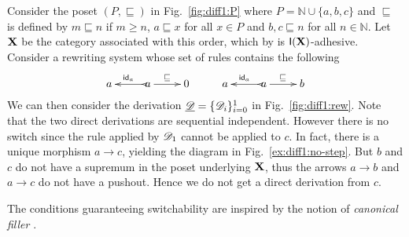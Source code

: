 \begin{example}
	\label{ex:diff1}
	Consider the poset $(P, \sqsubseteq)$ in Fig.~\ref{fig:diff1:P} where
	$P = \mathbb{N} \cup \{a,b,c\}$ and $\sqsubseteq$ is defined by
	$m \sqsubseteq n$ if $m \geq n$, $a \sqsubseteq x$ for all $x \in P$
	and $b, c \sqsubseteq n$ for all $n \in \mathbb{N}$.
	Let $\textbf {\textup{X}}$ be the  
	category associated with this order, which by  is
	$\mathsf{I(\textbf {\textup{X}})}$-adhesive. 
	Consider a rewriting
	system whose set of rules contains the following 
	\[\xymatrix{a & a \ar[r]^{\sqsubseteq} \ar@{>->}[l]_{\id{a}} & 0 & a & a
		\ar[r]^{\sqsubseteq} \ar@{>->}[l]_{\id{a}} & b }\]
	We can then consider the  derivation
	$\underline{\mathscr{D}}=\{\mathscr{D}_i\}_{i=0}^1$ in Fig.~\ref{fig:diff1:rew}.
	Note that the two direct derivations are sequential
	independent. However there is no switch since the rule applied by
	$\mathscr{D}_1$ cannot be applied to $c$. In fact, there is a unique morphism
	$a\to c$, yielding the diagram in Fig.~\ref{ex:diff1:no-step}. But $b$ and $c$
	do not have a supremum in the poset underlying $\textbf {\textup{X}}$, thus the arrows
	$a\to b$ and $a\to c$ do not have a
	pushout. Hence we do not get a direct derivation from $c$.
\end{example}

The conditions guaranteeing switchability are inspired
by the notion of \emph{canonical filler}
\cite{heindel2009category}.

